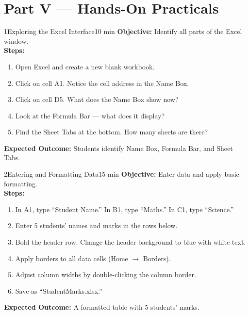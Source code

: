 \chapter{Part V --- Hands-On Practicals}
\label{ch:lab5}


\begin{labactivity}{1}{Exploring the Excel Interface}{10 min}
\textbf{Objective:} Identify all parts of the Excel window.\\[4pt]
\textbf{Steps:}
\begin{enumerate}[label=\protect\stepcircle{\arabic*}, leftmargin=2cm, itemsep=4pt]
  \item Open Excel and create a new blank workbook.
  \item Click on cell A1. Notice the cell address in the Name Box.
  \item Click on cell D5. What does the Name Box show now?
  \item Look at the Formula Bar --- what does it display?
  \item Find the Sheet Tabs at the bottom. How many sheets are there?
\end{enumerate}
\textbf{Expected Outcome:} Students identify Name Box, Formula Bar, and Sheet Tabs.
\welldone
\end{labactivity}

\begin{labactivity}{2}{Entering and Formatting Data}{15 min}
\textbf{Objective:} Enter data and apply basic formatting.\\[4pt]
\textbf{Steps:}
\begin{enumerate}[label=\protect\stepcircle{\arabic*}, leftmargin=2cm, itemsep=4pt]
  \item In A1, type ``Student Name.'' In B1, type ``Maths.'' In C1, type ``Science.''
  \item Enter 5 students' names and marks in the rows below.
  \item Bold the header row. Change the header background to blue with white text.
  \item Apply borders to all data cells (Home $\rightarrow$ Borders).
  \item Adjust column widths by double-clicking the column border.
  \item Save as ``StudentMarks.xlsx.''
\end{enumerate}
\textbf{Expected Outcome:} A formatted table with 5 students' marks.
\welldone
\end{labactivity}

